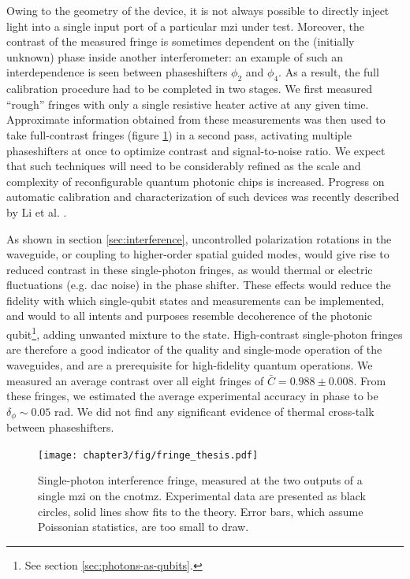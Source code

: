 Owing to the geometry of the device, it is not always possible to directly inject light into a single input port of a particular \gls{mzi} under test. Moreover, the contrast of the measured fringe is sometimes dependent on the (initially unknown) phase inside another interferometer: an example of such an interdependence is seen between phaseshifters $\phi_2$ and $\phi_4$.  As a result, the full calibration procedure had to be completed in two stages. We first measured ``rough'' fringes with only a single resistive heater active at any given time. Approximate information obtained from these measurements was then used to take full-contrast fringes (figure \ref{fig:full-contrast-fringe}) in a second pass, activating multiple phaseshifters at once to optimize contrast and signal-to-noise ratio. We expect that such techniques will need to be considerably refined as the scale and complexity of reconfigurable quantum photonic chips is increased. Progress on automatic calibration and characterization of such devices was recently described by Li et al. \cite{Li2013}.

As shown in section \ref{sec:interference}, uncontrolled polarization rotations in the waveguide, or coupling to higher-order spatial guided modes, would give rise to reduced contrast in these single-photon fringes, as would thermal or electric fluctuations (e.g. \gls{dac} noise) in the phase shifter. These effects would reduce the fidelity with which single-qubit states and measurements can be implemented, and would to all intents and purposes resemble decoherence of the photonic qubit\footnote{See section \ref{sec:photons-as-qubits}.}, adding unwanted mixture to the state. High-contrast single-photon fringes are therefore a good indicator of the quality and single-mode operation of the waveguides, and are a prerequisite for high-fidelity quantum operations. We measured an average contrast over all eight fringes of $\bar{C} = 0.988 \pm 0.008$.  From these fringes, we estimated the average experimental accuracy in phase to be $\delta_{\phi} \sim 0.05$ \si{\radian}.  We did not find any significant evidence of thermal cross-talk between phaseshifters.

\begin{figure}[t]
\centering
\texttt{[image: chapter3/fig/fringe\_thesis.pdf]}
\caption[Single-photon interference in the \acrshort{cnotmz}]{ Single-photon interference fringe, measured at the two outputs of a single \gls{mzi} on the \acrshort{cnotmz}. Experimental data are presented as black circles, solid lines show fits to the theory.  Error bars, which assume Poissonian statistics, are too small to draw.}
\label{fig:full-contrast-fringe}
\end{figure}


